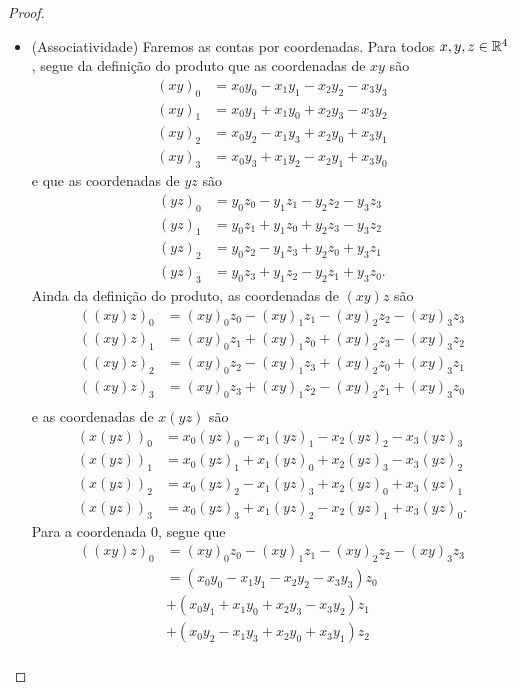 \begin{proof}
\begin{itemize}
	\item (Associatividade) Faremos as contas por coordenadas. Para todos $x,y,z \in \mathbb{R}^4$, segue da definição do produto que as coordenadas de $xy$ são
		\begin{align*}
		(xy)_0 &= x_0y_0 - x_1y_1 - x_2y_2 - x_3y_3 \\
		(xy)_1 &= x_0y_1 + x_1y_0 + x_2y_3 - x_3y_2 \\
		(xy)_2 &= x_0y_2 - x_1y_3 + x_2y_0 + x_3y_1 \\
		(xy)_3 &= x_0y_3 + x_1y_2 - x_2y_1 + x_3y_0
		\end{align*}
	e que as coordenadas de $yz$ são
		\begin{align*}
		(yz)_0 &= y_0z_0 - y_1z_1 - y_2z_2 - y_3z_3 \\
		(yz)_1 &= y_0z_1 + y_1z_0 + y_2z_3 - y_3z_2 \\
		(yz)_2 &= y_0z_2 - y_1z_3 + y_2z_0 + y_3z_1 \\
		(yz)_3 &= y_0z_3 + y_1z_2 - y_2z_1 + y_3z_0.
		\end{align*}
	Ainda da definição do produto, as coordenadas de $(xy)z$ são
		\begin{align*}
		((xy)z)_0 &= (xy)_0z_0 - (xy)_1z_1 - (xy)_2z_2 - (xy)_3z_3 \\
		((xy)z)_1 &= (xy)_0z_1 + (xy)_1z_0 + (xy)_2z_3 - (xy)_3z_2 \\
		((xy)z)_2 &= (xy)_0z_2 - (xy)_1z_3 + (xy)_2z_0 + (xy)_3z_1 \\
		((xy)z)_3 &= (xy)_0z_3 + (xy)_1z_2 - (xy)_2z_1 + (xy)_3z_0 \\
		\end{align*}
	e as coordenadas de $x(yz)$ são
		\begin{align*}
		(x(yz))_0 &= x_0(yz)_0 - x_1(yz)_1 - x_2(yz)_2 - x_3(yz)_3 \\
		(x(yz))_1 &= x_0(yz)_1 + x_1(yz)_0 + x_2(yz)_3 - x_3(yz)_2 \\
		(x(yz))_2 &= x_0(yz)_2 - x_1(yz)_3 + x_2(yz)_0 + x_3(yz)_1 \\
		(x(yz))_3 &= x_0(yz)_3 + x_1(yz)_2 - x_2(yz)_1 + x_3(yz)_0.
		\end{align*}
	Para a coordenada $0$, segue que
		\begin{align*}
		((xy)z)_0 &= (xy)_0z_0 - (xy)_1z_1 - (xy)_2z_2 - (xy)_3z_3 \\
			&= (x_0y_0 - x_1y_1 - x_2y_2 - x_3y_3)z_0 \\
			&+ (x_0y_1 + x_1y_0 + x_2y_3 - x_3y_2)z_1 \\
			&+ (x_0y_2 - x_1y_3 + x_2y_0 + x_3y_1)z_2 \\

\end{align*}
\end{itemize}
\end{proof}
